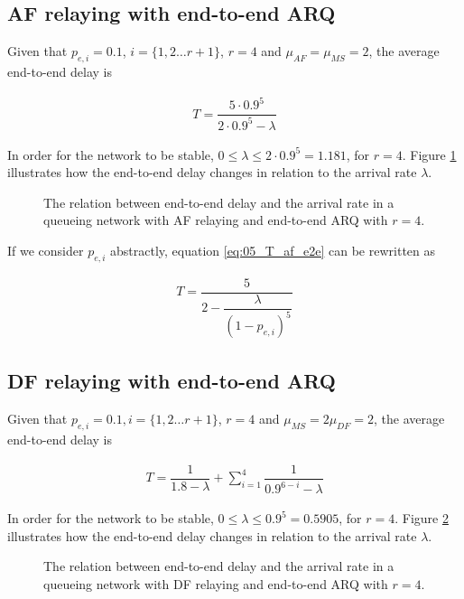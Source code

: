 \subsection{AF relaying with end-to-end ARQ}
Given that $p_{e,i} = 0.1$, $i = \{1,2 \dots r+1\}$, $r=4$ and
$\mu_{AF} = \mu_{MS} = 2$, the average end-to-end delay is

\begin{align}
  T = \dfrac{5 \cdot 0.9^5}{2 \cdot 0.9^5 - \lambda}
  \label{eq:05_T_af_e2e}
\end{align}

In order for the network to be stable,
$0 \leq \lambda \leq 2 \cdot 0.9^5 = 1.181$, for $r=4$. Figure
\ref{fig:05_arrival_rate_af_e2e} illustrates how the end-to-end delay changes
in relation to the arrival rate $\lambda$.

\begin{figure}\centering
  
  \caption{The relation between end-to-end delay and the arrival rate in a
    queueing network with AF relaying and end-to-end ARQ with $r=4$.}
  \label{fig:05_arrival_rate_af_e2e}
\end{figure}

If we consider $p_{e,i}$ abstractly, equation \ref{eq:05_T_af_e2e} can be
rewritten as

\begin{align*}
  T = \dfrac{5}{2 - \dfrac{\lambda}{(1-p_{e,i})^5}}
\end{align*}


\subsection{DF relaying with end-to-end ARQ}

Given that $p_{e,i} = 0.1, i = \{1,2 \dots r+1\}$, $r=4$ and
$\mu_{MS} = 2\mu_{DF} = 2$, the average end-to-end delay is

\begin{align}
  T = \dfrac{1}{1.8 - \lambda} + \sum\limits_{i=1}^4 \dfrac{1}{0.9^{6-i} - \lambda}
  \label{eq:05_T_df_e2e}
\end{align}


In order for the network to be stable,
$0 \leq \lambda \leq 0.9^5 = 0.5905$, for $r=4$. Figure
\ref{fig:05_arrival_rate_df_e2e} illustrates how the end-to-end delay changes in
relation to the arrival rate $\lambda$.


\begin{figure}\centering
  
  \caption{The relation between end-to-end delay and the arrival rate in a
    queueing network with DF relaying and end-to-end ARQ with $r=4$.}
  \label{fig:05_arrival_rate_df_e2e}
\end{figure}


